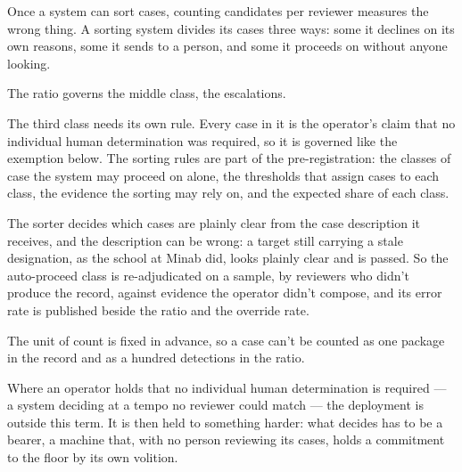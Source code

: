 Once a system can sort cases, counting candidates per reviewer measures the wrong thing. A sorting system divides its cases three ways: some it declines on its own reasons, some it sends to a person, and some it proceeds on without anyone looking.

The ratio governs the middle class, the escalations.

The third class needs its own rule. Every case in it is the operator's claim that no individual human determination was required, so it is governed like the exemption below. The sorting rules are part of the pre-registration: the classes of case the system may proceed on alone, the thresholds that assign cases to each class, the evidence the sorting may rely on, and the expected share of each class.

The sorter decides which cases are plainly clear from the case description it receives, and the description can be wrong: a target still carrying a stale designation, as the school at Minab did, looks plainly clear and is passed. So the auto-proceed class is re-adjudicated on a sample, by reviewers who didn't produce the record, against evidence the operator didn't compose, and its error rate is published beside the ratio and the override rate.

The unit of count is fixed in advance, so a case can't be counted as one package in the record and as a hundred detections in the ratio.

Where an operator holds that no individual human determination is required — a system deciding at a tempo no reviewer could match — the deployment is outside this term. It is then held to something harder: what decides has to be a bearer, a machine that, with no person reviewing its cases, holds a commitment to the floor by its own volition.

